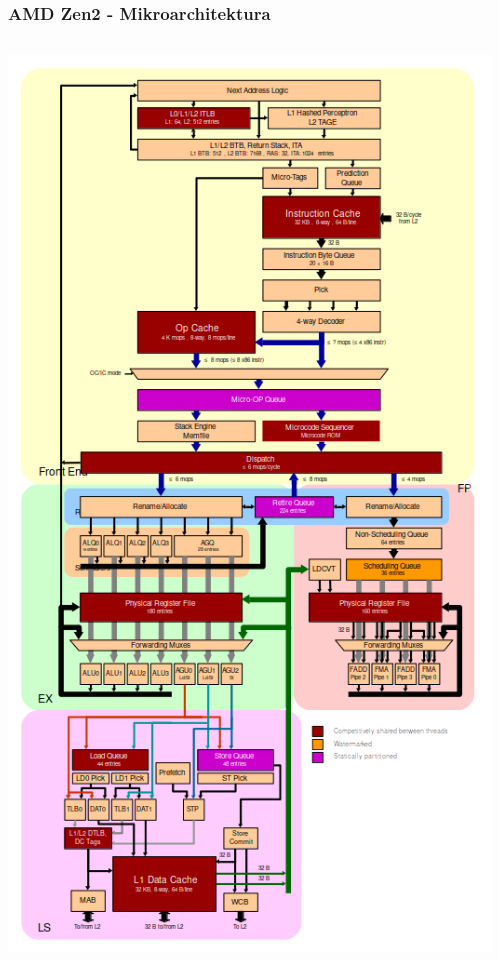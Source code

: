 \documentclass{beamer}
\begin{document}
\begin{frame}
\frametitle{AMD Zen2 - Mikroarchitektura}

\begin{columns}[T]
\begin{column}{0.34\textwidth}
\includegraphics[width=\textwidth]{fig/amd_zen2.png}
\end{column}
\begin{column}{0.66\textwidth}

\end{column}
\end{columns}
\end{frame}
\end{document}
